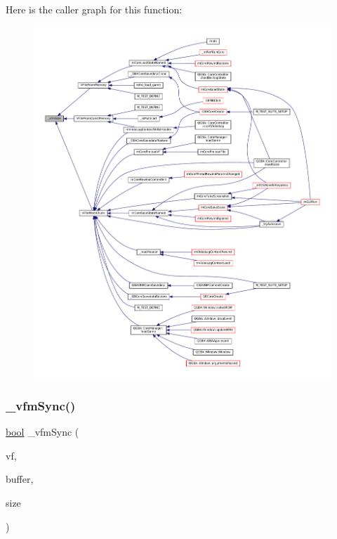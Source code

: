 Here is the caller graph for this function\+:
\nopagebreak
\begin{figure}[H]
\begin{center}
\leavevmode
\includegraphics[width=350pt]{vfs-mem_8c_acf696d7e820407942040897ac462989b_icgraph}
\end{center}
\end{figure}
\mbox{\label{vfs-mem_8c_a6d41b490b4553a84cae05c6fcc9cade3}} 
\subsubsection{\texorpdfstring{\+\_\+vfm\+Sync()}{\_vfmSync()}}
{\footnotesize\ttfamily \mbox{\hyperlink{libretro_8h_a4a26dcae73fb7e1528214a068aca317e}{bool}} \+\_\+vfm\+Sync (\begin{DoxyParamCaption}\item[{struct V\+File $\ast$}]{vf,  }\item[{const void $\ast$}]{buffer,  }\item[{size\+\_\+t}]{size }\end{DoxyParamCaption})\hspace{0.3cm}{\ttfamily [static]}}

